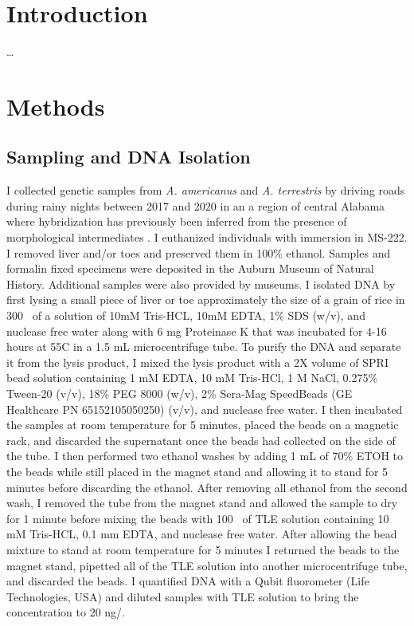 \section{Introduction}
\ldots
\section{Methods}
\subsection{Sampling and DNA Isolation}
I collected genetic samples from \textit{A. americanus} and \textit{A. terrestris}
by driving roads during rainy nights between 2017 and 2020
in an a region of central Alabama where hybridization has previously been
inferred from the presence of morphological intermediates \parencite{weatherby1982}. 
I euthanized individuals with immersion in MS-222.
I removed liver and/or toes and preserved them in 100\% ethanol.
Samples and formalin fixed specimens were deposited in the Auburn Museum of Natural History.
Additional samples were also provided by museums.
I isolated DNA by first lysing a small piece of liver or toe approximately 
the size of a grain of rice in 300 \uL\ of a solution of 10mM Tris-HCL, 10mM EDTA, 
1\% SDS (w/v), and nuclease free water along with 6 mg Proteinase K that was 
incubated for 4-16 hours at 55\degree C in a 1.5 mL microcentrifuge tube.  
To purify the DNA and separate it from the lysis product, I mixed the lysis 
product with a 2X volume of SPRI bead solution containing 1 mM EDTA,  
10 mM Tris-HCl, 1 M NaCl, 0.275\% Tween-20 (v/v), 18\% PEG 8000 (w/v), 
2\% Sera-Mag SpeedBeads (GE Healthcare PN 65152105050250) (v/v), and nuclease free water.
I then incubated the samples at room temperature for 5 minutes, placed the 
beads on a magnetic rack, and discarded the supernatant once the beads had collected
on the side of the tube.  
I then performed two ethanol washes by adding 1 mL of 70\% ETOH to the beads
while still placed in the magnet stand and allowing it to stand for 5 minutes
before discarding the ethanol. 
After removing all ethanol from the second wash, I removed the tube from the magnet 
stand and allowed the sample to dry for 1 minute before mixing the beads with 100 \uL\ of 
TLE solution containing 10 mM Tris-HCL, 0.1 mm EDTA, and nuclease free water.
After allowing the bead mixture to stand at room temperature for 5 minutes I returned
the beads to the magnet stand, pipetted all of the TLE solution into another 
microcentrifuge tube, and discarded the beads. I quantified DNA with a Qubit
fluorometer (Life Technologies, USA) and diluted samples with TLE solution to 
bring the concentration to 20 ng/\uL.

